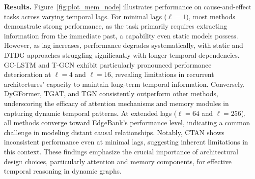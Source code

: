  \textbf{Results.} Figure~\ref{fig:plot_mem_node} illustrates performance on cause-and-effect tasks across varying temporal lags. For minimal lags ($\ell = 1$), most methods demonstrate strong performance, as the task primarily requires extracting information from the immediate past, a capability even static models possess. However, as lag increases, performance degrades systematically, with static and DTDG approaches struggling significantly with longer temporal dependencies. GC-LSTM and T-GCN exhibit particularly pronounced performance deterioration at $\ell = 4$ and $\ell = 16$, revealing limitations in recurrent architectures' capacity to maintain long-term temporal information. Conversely, DyGFormer, TGAT, and TGN consistently outperform other methods, underscoring the efficacy of attention mechanisms and memory modules in capturing dynamic temporal patterns. At extended lags ($\ell = 64$ and $\ell = 256$), all methods converge toward EdgeBank's performance level, indicating a common challenge in modeling distant causal relationships. Notably, CTAN shows inconsistent performance even at minimal lags, suggesting inherent limitations in this context. These findings emphasize the crucial importance of architectural design choices, particularly attention and memory components, for effective temporal reasoning in dynamic graphs.
